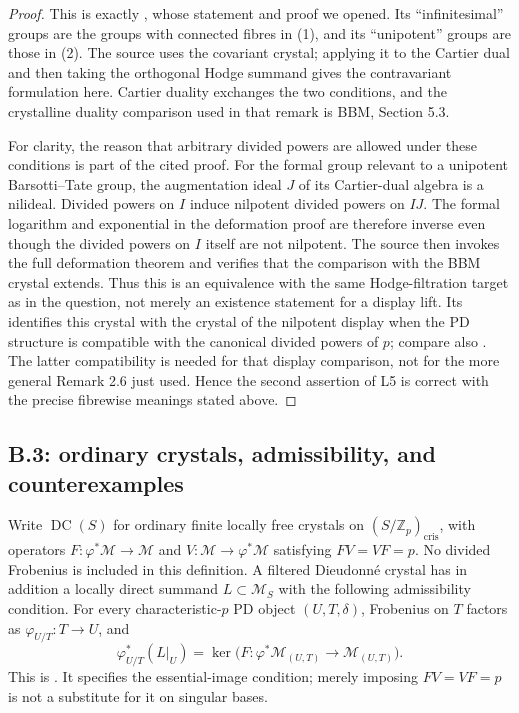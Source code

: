 \begin{proof}
This is exactly \cite[Remark 2.6]{B:LauSmoothness}, whose statement
and proof we opened. Its ``infinitesimal'' groups are the groups
with connected fibres in (1), and its ``unipotent'' groups are those
in (2). The source uses the covariant crystal; applying it to the
Cartier dual and then taking the orthogonal Hodge summand gives the
contravariant formulation here. Cartier duality exchanges the two
conditions, and the crystalline duality comparison used in that
remark is BBM, Section 5.3.

For clarity, the reason that arbitrary divided powers are allowed
under these conditions is part of the cited proof. For the formal
group relevant to a unipotent Barsotti--Tate group, the augmentation
ideal $J$ of its Cartier-dual algebra is a nilideal. Divided powers
on $I$ induce nilpotent divided powers on $IJ$. The formal logarithm
and exponential in the deformation proof are therefore inverse
even though the divided powers on $I$ itself are not nilpotent.
The source then invokes the full deformation theorem and verifies
that the comparison with the BBM crystal extends. Thus this is an
equivalence with the same Hodge-filtration target as in the question,
not merely an existence statement for a display lift.
Its \cite[Corollary 2.7]{B:LauSmoothness} identifies this crystal with
the crystal of the nilpotent display when the PD structure is
compatible with the canonical divided powers of $p$; compare also
\cite[Corollary 97]{B:ZinkDisplay}. The latter compatibility is needed
for that display comparison, not for the more general Remark 2.6
just used. Hence the second assertion of L5 is correct with the
precise fibrewise meanings stated above.
\end{proof}

\subsection{B.3: ordinary crystals, admissibility, and counterexamples}

Write $\operatorname{DC}(S)$ for ordinary finite locally free crystals
on $(S/\mathbb Z_p)_{\mathrm{cris}}$, with operators
$F:\varphi^*\mathcal M\to\mathcal M$ and
$V:\mathcal M\to\varphi^*\mathcal M$ satisfying $FV=VF=p$.
No divided Frobenius is included in this definition.
A filtered Dieudonn\'e crystal has in addition a locally direct
summand $L\subset\mathcal M_S$ with the following admissibility
condition. For every characteristic-$p$ PD object $(U,T,\delta)$,
Frobenius on $T$ factors as $\varphi_{U/T}:T\to U$, and
\begin{equation}\label{B:admissibility}
 \varphi_{U/T}^*(L|_U)=
 \ker\bigl(F:\varphi^*\mathcal M_{(U,T)}\to\mathcal M_{(U,T)}\bigr).
\end{equation}
This is \cite[Section 3, equation (3.1)]{B:LauDivided}.
It specifies the essential-image condition; merely imposing
$FV=VF=p$ is not a substitute for it on singular bases.

